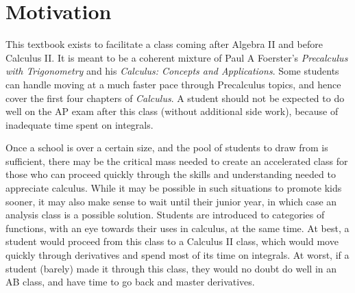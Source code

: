 

\section{Motivation}

This textbook exists to facilitate a class coming after Algebra II and before Calculus II.  It is meant
to be a coherent mixture of Paul A Foerster's \textit{Precalculus with Trigonometry} and his
\textit{Calculus: Concepts and Applications}.  Some students can handle moving at a much 
faster pace through Precalculus topics, and hence cover the first four chapters of \textit{Calculus}.  
A student should not be expected to 
do well on the AP exam after this class (without additional side work), because of inadequate
time spent on integrals.  

    

Once a school is over a certain size, and the pool of students to draw from is sufficient, there may
be the critical mass needed to create an accelerated class for those who can proceed quickly through 
the skills and understanding needed to appreciate calculus.  While it may be possible in such
situations to promote kids sooner, it may also make sense to wait until their junior year, in which case
an analysis class is a possible solution.  Students are introduced to categories of 
functions, with an eye towards their uses in calculus, at the same time.  At best, a student would proceed
from this class to a Calculus II class, which would move quickly through derivatives and 
spend most of its time on integrals.  At worst, if a student (barely) made it through this class, they would
no doubt do well in an AB class, and have time to go back and master derivatives.


